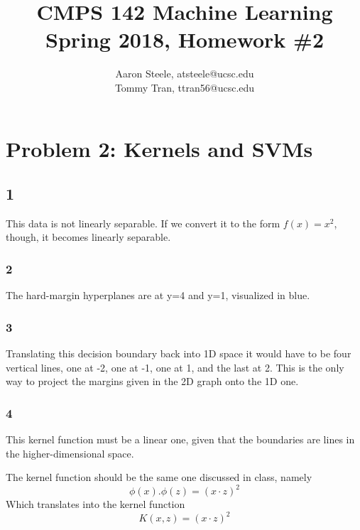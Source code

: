 \documentclass[12pt]{article}
\title{\textbf{CMPS 142 Machine Learning\\ Spring 2018, Homework \#2}}
\date{}
\author{Aaron Steele, atsteele@ucsc.edu\\
	Tommy Tran, ttran56@ucsc.edu}
\begin{document}
	
	\maketitle
	
	\section*{Problem 2: Kernels and SVMs}
    \subsection*{1}
    This data is not linearly separable. If we convert it to the form $f(x) = x^2$, though, it becomes linearly separable.
    
    
    \subsubsection*{2}
    The hard-margin hyperplanes are at y=4 and y=1, visualized in blue.
    
    
    \subsubsection*{3}
    Translating this decision boundary back into 1D space it would have to be four vertical lines, one at -2, one at -1, one at 1, and the last at 2. This is the only way to project the margins given in the 2D graph onto the 1D one. 
    
    \subsubsection*{4}
    This kernel function must be a linear one, given that the boundaries are lines in the higher-dimensional space.
    
    The kernel function should be the same one discussed in class, namely
    $$ \phi(x).\phi(z) = (x \cdot z)^2 $$
    Which translates into the kernel function
    $$ K(x,z) = (x \cdot z)^2 $$
    
\end{document}
